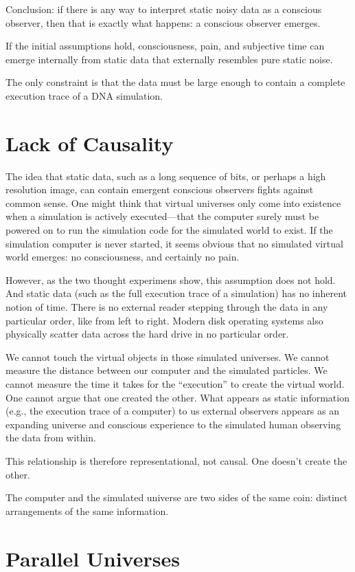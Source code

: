 Conclusion: if there is any way to interpret static noisy data as a conscious observer, then that is exactly what happens:
a conscious observer emerges.

If the initial assumptions hold, consciousness, pain, and subjective time can emerge internally from static data that externally resembles pure static noise.

The only constraint is that the data must be large enough to contain a complete execution trace of a DNA simulation.


\section*{Lack of Causality}

The idea that static data, such as a long sequence of bits, or perhaps a high resolution image, can contain emergent conscious observers fights against common sense.
One might think that virtual universes only come into existence when a simulation is actively executed—that the computer surely must be powered on to run the simulation
code for the simulated world to exist.
If the simulation computer is never started, it seems obvious that no simulated virtual world emerges: no consciousness, and certainly no pain.

However, as the two thought experimens show, this assumption does not hold. And static data (such as the full execution trace of a simulation) has no inherent notion of time.
There is no external reader stepping through the data in any particular order, like from left to right.
Modern disk operating systems also physically scatter data across the hard drive in no particular order.

We cannot touch the virtual objects in those simulated universes.
We cannot measure the distance between our computer and the simulated particles.
We cannot measure the time it takes for the ``execution'' to create the virtual world.
One cannot argue that one created the other.
What appears as static information (e.g., the execution trace of a computer) to us external observers appears as an expanding universe and
conscious experience to the simulated human observing the data from within.

This relationship is therefore representational, not causal. One doesn't create the other. 

The computer and the simulated universe are two sides of the same coin: distinct arrangements of the same information.


\section{Parallel Universes}

